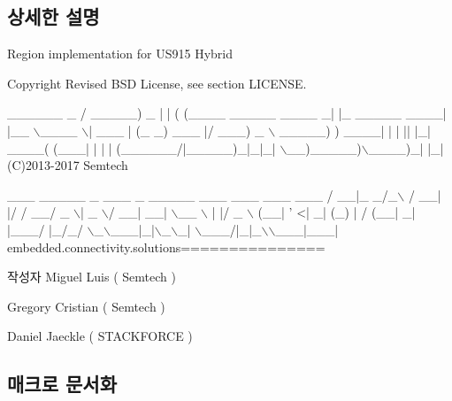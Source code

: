 \subsection{상세한 설명}
Region implementation for U\+S915 Hybrid 

\begin{DoxyCopyright}{Copyright}
Revised B\+SD License, see section L\+I\+C\+E\+N\+SE.
\end{DoxyCopyright}

\begin{DoxyCode}
  \_\_\_\_\_\_                              \_
 / \_\_\_\_\_)             \_              | |
( (\_\_\_\_  \_\_\_\_\_ \_\_\_\_ \_| |\_ \_\_\_\_\_  \_\_\_\_| |\_\_
 \(\backslash\)\_\_\_\_ \(\backslash\)| \_\_\_ |    (\_   \_) \_\_\_ |/ \_\_\_)  \_ \(\backslash\)
 \_\_\_\_\_) ) \_\_\_\_| | | || |\_| \_\_\_\_( (\_\_\_| | | |
(\_\_\_\_\_\_/|\_\_\_\_\_)\_|\_|\_| \(\backslash\)\_\_)\_\_\_\_\_)\(\backslash\)\_\_\_\_)\_| |\_|
(C)2013-2017 Semtech

 \_\_\_ \_\_\_\_\_ \_   \_\_\_ \_  \_\_\_\_\_ \_\_\_  \_\_\_  \_\_\_ \_\_\_
/ \_\_|\_   \_/\_\(\backslash\) / \_\_| |/ / \_\_/ \_ \(\backslash\)| \_ \(\backslash\)/ \_\_| \_\_|
\(\backslash\)\_\_ \(\backslash\) | |/ \_ \(\backslash\) (\_\_| \textcolor{stringliteral}{' <| \_| (\_) |   / (\_\_| \_|}
\textcolor{stringliteral}{|\_\_\_/ |\_/\_/ \(\backslash\)\_\(\backslash\)\_\_\_|\_|\(\backslash\)\_\(\backslash\)\_| \(\backslash\)\_\_\_/|\_|\_\(\backslash\)\(\backslash\)\_\_\_|\_\_\_|}
\textcolor{stringliteral}{embedded.connectivity.solutions===============}
\end{DoxyCode}


\begin{DoxyAuthor}{작성자}
Miguel Luis ( Semtech )

Gregory Cristian ( Semtech )

Daniel Jaeckle ( S\+T\+A\+C\+K\+F\+O\+R\+CE ) 
\end{DoxyAuthor}


\subsection{매크로 문서화}
\mbox{\label{_region_u_s915-_hybrid_8c_a1b20a8de3ae59c0b063fb313f0c70890}} 
